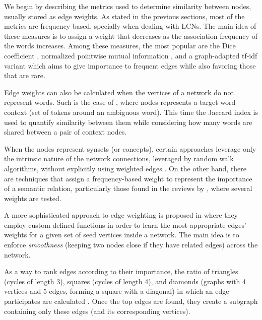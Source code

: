 We begin by describing the metrics used to determine similarity between nodes, usually stored as edge weights. As stated in the previous sections, most of the metrics are frequency based, specially when dealing with LCNs. The main idea of these measures is to assign a weight that decreases as the association frequency of the words increases. Among these measures, the most popular are the Dice  coefficient \cite{2010.Navigli.InducingWordSenses.Triangles,2011.DiMarco.Navigli.ClusteringWebSearch,2013.DiMarco.Navigli.ClusteringGraph-BasedWSI}, normalized pointwise mutual information \cite{2013.Hope.GradedWSI}, and a graph-adapted tf-idf variant \cite{2007.Tsatsaronis.WSDwithSpreading} which aims to give importance to frequent edges while also favoring those that are rare.

Edge weights can also be calculated when the vertices of a network do not represent words. Such is the case of \cite{2010.Klapaftis.WSD.WSD.HierarchicalGraphs}, where nodes represents a target word context (set of tokens around an ambiguous word). This time the Jaccard index is used to quantify similarity between them while considering how many words are shared between a pair of context nodes.

When the nodes represent synsets (or concepts), certain approaches leverage only the intrinsic nature of the network connections, leveraged by random walk algorithms, without explicitly using  weighted edges \cite{2004.Mihalcea.SemanticNetworkPageRank}. 
 On the other hand, there are techniques that assign a frequency-based weight to represent the importance of a semantic relation, particularly those found in the reviews  by \cite{2007.Sinha.Mihalcea.Unsupervised,2007.Navigli.GraphConnectivity}, where several weights are tested.

A  more sophisticated approach to edge weighting is proposed in \cite{2013.Saluja.Graph-BasedUnsupervisedLearning} where they employ  custom-defined functions in order to learn the most appropriate edges' weights for a given set of seed vertices inside a network. The main idea  is to enforce \textit{smoothness}  (keeping two nodes close if they have related edges) across the network.

As a way to rank edges according to their importance, the ratio of triangles (cycles of length 3), squares (cycles of length 4), and diamonds (graphs with 4 vertices and 5 edges, forming a square with a diagonal) in which an edge participates are calculated \cite{2010.Navigli.InducingWordSenses.Triangles,2013.DiMarco.Navigli.ClusteringGraph-BasedWSI}. Once the top edges are found, they create a subgraph containing only these edges (and its corresponding vertices).

